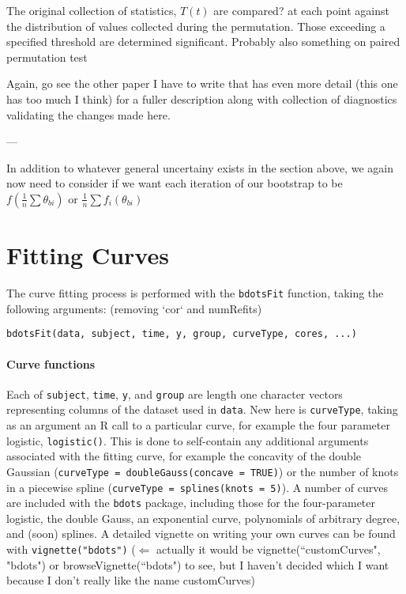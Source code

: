 \documentclass{article}
\begin{document}
The original collection of statistics, $T(t)$ are compared? at each point against the distribution of values collected during the permutation. Those exceeding a specified threshold are determined significant. Probably also something on paired permutation test

Again, go see the other paper I have to write that has even more detail (this one has too much I think) for a fuller description along with collection of diagnostics validating the changes made here.


---

In addition to whatever general uncertainy exists in the section above, we again now need to consider if we want each iteration of our bootstrap to be $f ( \frac1n \sum \theta_{bi})$ or $ \frac1n \sum f_i (\theta_{bi})$

\section{Fitting Curves}

The curve fitting process is performed with the \texttt{bdotsFit} function, taking the following arguments: (removing `cor` and numRefits)

\begin{center}
\begin{verbatim}
bdotsFit(data, subject, time, y, group, curveType, cores, ...)
\end{verbatim}
\end{center}

\paragraph{Curve functions} Each of \texttt{subject}, \texttt{time}, \texttt{y}, and \texttt{group} are length one character vectors representing columns of the dataset used in \texttt{data}. New here is \texttt{curveType}, taking as an argument an R call to a particular curve, for example the four parameter logistic, \texttt{logistic()}. This is done to self-contain any additional arguments associated with the fitting curve, for example the concavity of the double Gaussian (\texttt{curveType = doubleGauss(concave = TRUE)}) or the number of knots in a piecewise spline (\texttt{curveType = splines(knots = 5)}). A number of curves are included with the \texttt{bdots} package, including those for the four-parameter logistic, the double Gauss, an exponential curve, polynomials of arbitrary degree, and (soon) splines. A detailed vignette on writing your own curves can be found with \texttt{vignette("bdots")} ($\Leftarrow$ actually it would be vignette(``customCurves", "bdots") or browseVignette(``bdots") to see, but I haven't decided which I want because I don't really like the name customCurves)
\end{document}
